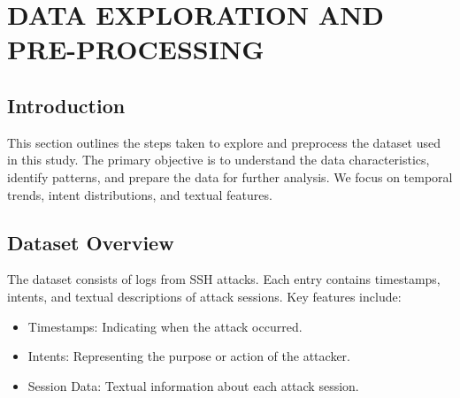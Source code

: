 

\section{DATA EXPLORATION AND PRE-PROCESSING}


    \subsection{Introduction}
        
        This section outlines the steps taken to explore and preprocess the dataset used in this study. The primary objective is to understand the data characteristics, identify patterns, and prepare the data for further analysis. We focus on temporal trends, intent distributions, and textual features.
        
    \subsection{Dataset Overview}
    
        The dataset consists of logs from SSH attacks. Each entry contains timestamps, intents, and textual descriptions of attack sessions. Key features include:
        
        \begin{itemize}
            \item Timestamps: Indicating when the attack occurred.
            \item Intents: Representing the purpose or action of the attacker.
            \item Session Data: Textual information about each attack session.
        \end{itemize}

